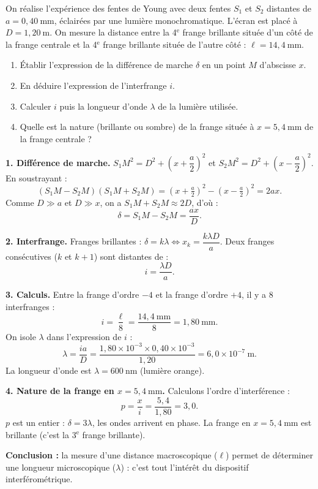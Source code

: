 \documentclass[11pt]{article}
\newcommand{\cle}[1]{{\popxbold\color{popdark}#1}}
\begin{document}
\begin{exoresolu}
On réalise l'expérience des fentes de Young avec deux fentes $S_1$ et $S_2$ distantes de $a = 0,40\ \text{mm}$, éclairées par une lumière monochromatique. L'écran est placé à $D = 1,20\ \text{m}$. On mesure la distance entre la 4$^{\text{e}}$ frange brillante située d'un côté de la frange centrale et la 4$^{\text{e}}$ frange brillante située de l'autre côté : $\ell = 14,4\ \text{mm}$.
\begin{enumerate}
\item Établir l'expression de la différence de marche $\delta$ en un point $M$ d'abscisse $x$.
\item En déduire l'expression de l'interfrange $i$.
\item Calculer $i$ puis la longueur d'onde $\lambda$ de la lumière utilisée.
\item Quelle est la nature (brillante ou sombre) de la frange située à $x = 5,4\ \text{mm}$ de la frange centrale ?
\end{enumerate}
\tcblower
\textbf{1. Différence de marche.} $S_1M^2 = D^2 + \left(x + \dfrac{a}{2}\right)^2$ et $S_2M^2 = D^2 + \left(x - \dfrac{a}{2}\right)^2$. En soustrayant :
\[ (S_1M - S_2M)(S_1M + S_2M) = \left(x + \tfrac{a}{2}\right)^2 - \left(x - \tfrac{a}{2}\right)^2 = 2ax. \]
Comme $D \gg a$ et $D \gg x$, on a $S_1M + S_2M \approx 2D$, d'où :
\[ \boxed{\delta = S_1M - S_2M = \frac{ax}{D}}. \]

\textbf{2. Interfrange.} Franges brillantes : $\delta = k\lambda \Leftrightarrow x_k = \dfrac{k\lambda D}{a}$. Deux franges consécutives ($k$ et $k+1$) sont distantes de :
\[ \boxed{i = \frac{\lambda D}{a}}. \]

\textbf{3. Calculs.} Entre la frange d'ordre $-4$ et la frange d'ordre $+4$, il y a $8$ interfranges :
\[ i = \frac{\ell}{8} = \frac{14,4\ \text{mm}}{8} = 1,80\ \text{mm}. \]
On isole $\lambda$ dans l'expression de $i$ :
\[ \lambda = \frac{ia}{D} = \frac{1,80\times 10^{-3} \times 0,40\times 10^{-3}}{1,20} = 6,0\times 10^{-7}\ \text{m}. \]
La longueur d'onde est $\lambda = 600\ \text{nm}$ (lumière orange).

\textbf{4. Nature de la frange en $x = 5,4\ \text{mm}$.} Calculons l'ordre d'interférence :
\[ p = \frac{x}{i} = \frac{5,4}{1,80} = 3,0. \]
$p$ est un entier : $\delta = 3\lambda$, les ondes arrivent en phase. La frange en $x = 5,4\ \text{mm}$ est \cle{brillante} (c'est la 3$^{\text{e}}$ frange brillante).

\textbf{Conclusion :} la mesure d'une distance macroscopique ($\ell$) permet de déterminer une longueur microscopique ($\lambda$) : c'est tout l'intérêt du dispositif interférométrique.
\end{exoresolu}
\end{document}
